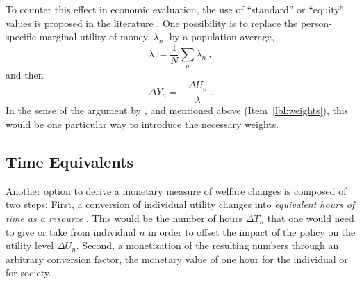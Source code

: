 To counter this effect in economic evaluation, the use of ``standard'' or ``equity'' values is proposed in the literature \citep[see][for an overview of possible solutions]{RizziSteinmetz2015VOTIncomePreferenceEquity}.
%
One possibility is to replace the person-specific marginal utility of money, $\lambda_n$, by a population average,
\begin{equation}
\overline\lambda := \frac{1}{N} \sum_n \lambda_n \ ,
\label{eq:av-utl-of-income}
\end{equation}
and then
\begin{equation}
\Delta Y_n = - \frac{\Delta U_n}{\overline\lambda} \ .
\label{eq:using-av-utl-of-income}
\end{equation}
%
In the sense of the argument by \cite{Fowkes2010ValueOfTTS}, \cite{OECD2006CBA} and \cite{GuehnemannEtAl2011MethodologyReportMCA} mentioned above (Item~\ref{lbl:weights}), this would be one particular way to introduce the necessary weights.



\subsection{Time Equivalents}
\label{ch:economicEval:aggregatingValues:time}


Another option to derive a monetary measure of welfare changes is composed of two steps:
%
First, a conversion of individual utility changes into \emph{equivalent hours of time as a resource} \citep{JaradiazEtc2008ValueOfLeisure, MackieJara-DiazFowkesTt-savings}. This would be the number of hours $\Delta T_n$ that one would need to give or take from individual $n$ in order to offset the impact of the policy on the utility level $\Delta U_n$. 
%
Second, a monetization of the resulting numbers through an arbitrary conversion factor, \ie the monetary value of one hour for the individual or for society.


